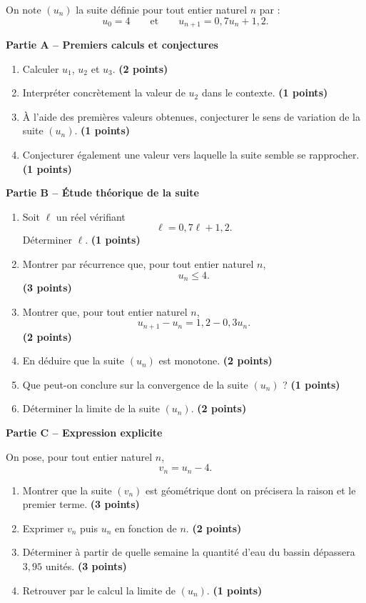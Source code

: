 \documentclass[11pt,a4paper]{article}
\newcommand{\bareme}[1]{\hfill{\color{blue!70!black}\textbf{(#1 points)}}}
\begin{document}
On note $(u_n)$ la suite définie pour tout entier naturel $n$ par :
\[
u_0=4
\qquad \text{et} \qquad
u_{n+1}=0{,}7u_n+1{,}2.
\]

\medskip

\textbf{Partie A -- Premiers calculs et conjectures}

\begin{enumerate}[label=\textbf{A.\arabic*.}, leftmargin=0.9cm]
    \item Calculer $u_1$, $u_2$ et $u_3$. \bareme{2}
    \item Interpréter concrètement la valeur de $u_2$ dans le contexte. \bareme{1}
    \item À l’aide des premières valeurs obtenues, conjecturer le sens de variation de la suite $(u_n)$. \bareme{1}
    \item Conjecturer également une valeur vers laquelle la suite semble se rapprocher. \bareme{1}
\end{enumerate}

\medskip

\textbf{Partie B -- Étude théorique de la suite}

\begin{enumerate}[label=\textbf{B.\arabic*.}, leftmargin=0.9cm]
    \item Soit $\ell$ un réel vérifiant
    \[
    \ell=0{,}7\ell+1{,}2.
    \]
    Déterminer $\ell$. \bareme{1}
    \item Montrer par récurrence que, pour tout entier naturel $n$,
    \[
    u_n\leq 4.
    \]
    \bareme{3}
    \item Montrer que, pour tout entier naturel $n$,
    \[
    u_{n+1}-u_n=1{,}2-0{,}3u_n.
    \]
    \bareme{2}
    \item En déduire que la suite $(u_n)$ est monotone. \bareme{2}
    \item Que peut-on conclure sur la convergence de la suite $(u_n)$ ? \bareme{1}
    \item Déterminer la limite de la suite $(u_n)$. \bareme{2}
\end{enumerate}

\medskip

\textbf{Partie C -- Expression explicite}

On pose, pour tout entier naturel $n$,
\[
v_n=u_n-4.
\]

\begin{enumerate}[label=\textbf{C.\arabic*.}, leftmargin=0.9cm]
    \item Montrer que la suite $(v_n)$ est géométrique dont on précisera la raison et le premier terme. \bareme{3}
    \item Exprimer $v_n$ puis $u_n$ en fonction de $n$. \bareme{2}
    \item Déterminer à partir de quelle semaine la quantité d’eau du bassin dépassera $3{,}95$ unités. \bareme{3}
    \item Retrouver par le calcul la limite de $(u_n)$. \bareme{1}
\end{enumerate}
\end{document}
